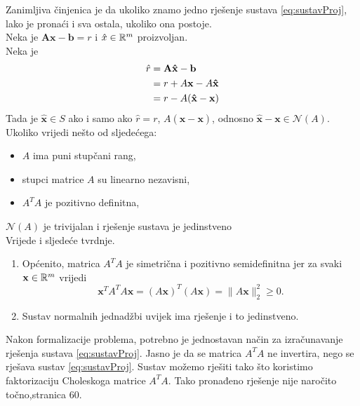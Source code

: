 \documentclass[a4paper,twoside,12pt]{memoir} %
\begin{document}
Zanimljiva činjenica je da 
ukoliko znamo jedno rješenje sustava \ref{eq:sustavProj}, lako je pronaći i sva ostala, ukoliko ona postoje.\\
Neka je $\mathbf{A}\mathbf{x} - \mathbf{b} = r$ i $\hat{x} \in \mathbb{R}^m$ proizvoljan.\\
Neka je
\begin{align}
	\hat{r}  &=  \mathbf{A}\mathbf{\hat{x}} - \mathbf{b} \notag \\
			&= r + A\mathbf{x} - A\mathbf{\hat{x}} \notag \\
			 &= r - A(\mathbf{\hat{x}} - \mathbf{x}) \notag
\end{align}
Tada je $\mathbf{\hat{x}} \in S$ ako i samo ako $\hat{r} = r$,  $ A(\mathbf{\hat{x}} - \mathbf{x}) $, odnosno $\mathbf{\hat{x}} - \mathbf{x} \in \mathcal{N}(A)$.\\
Ukoliko vrijedi nešto od sljedećega:
\begin{itemize}
	\item $A$ ima puni stupčani rang,
	\item stupci matrice $A$ su linearno nezavisni,
	\item $A^TA$ je pozitivno definitna,
\end{itemize}
 $\mathcal{N}(A)$ je trivijalan i rješenje sustava je jedinstveno 
\vspace{0.5cm}
\\Vrijede i sljedeće tvrdnje.%
\begin{enumerate}
	\item Općenito, matrica $A^TA$ je simetrična i pozitivno semidefinitna jer za svaki
	$\mathbf{x} \in \mathbb{R}^m$ vrijedi
	$$  \mathbf{x}^TA^TA\mathbf{x} = (A\mathbf{x})^T(A\mathbf{x}) = \|A\mathbf{x}\|_2^2 \geq 0. $$
	\item Sustav normalnih jednadžbi uvijek ima rješenje i to jedinstveno.
\end{enumerate}
\vspace{1cm}
Nakon formalizacije problema, potrebno je jednostavan način za izračunavanje rješenja sustava \ref{eq:sustavProj}.
Jasno je da se matrica $A^TA$ ne invertira, nego se rješava sustav \ref{eq:sustavProj}.
Sustav možemo rješiti tako što koristimo faktorizaciju Choleskoga matrice $A^TA$.
Tako pronađeno rješenje nije naročito točno\cite{singer07},stranica 60.\\
\end{document}
